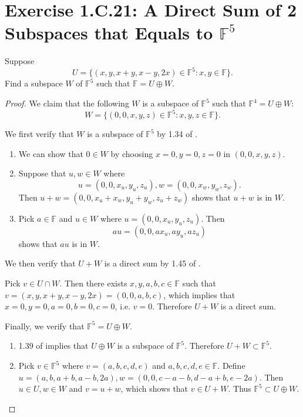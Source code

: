\section{Exercise 1.C.21: A Direct Sum of 2 Subspaces that Equals to $\mathbb{F}^5$}
Suppose\[
U=\{(x,y,x+y,x-y,2x)\in\mathbb{F}^5:x,y\in\mathbb{F}\}.
\]
Find a subspace $W$ of $\mathbb{F}^5$ such that $\mathbb{F}=U\oplus W$.
\begin{proof}
We claim that the following $W$ is a subspace of $\mathbb{F}^5$ such that $\mathbb{F}^4=U\oplus W$:
\[
W=\{(0,0,x,y,z)\in\mathbb{F}^5:x,y,z\in\mathbb{F}\}.
\]

We first verify that $W$ is a subspace of $\mathbb{F}^5$ by 1.34 of \cite{axler2014linear}.

\begin{enumerate}
\item We can show that $0\in W$ by choosing $x=0,y=0,z=0$ in $(0,0,x,y,z)$.
\item Suppose that $u,w\in W$ where \[u=(0,0,x_u,y_u,z_u), w=(0,0,x_w,y_w,z_w).\] Then $u+w=(0,0,x_u+x_w,y_u+y_w,z_u+z_w)$ shows that $u+w$ is in $W$.
\item Pick $a\in\mathbb{F}$ and $u\in W$ where $u=(0,0,x_u,y_u,z_u)$. Then \[au=(0,0,ax_u,ay_u,az_u)\] shows that $au$ is in $W$.
\end{enumerate}

We then verify that $U+W$ is a direct sum by 1.45 of \cite{axler2014linear}.

Pick $v\in U\cap W$. Then there exists $x,y,a,b,c\in\mathbb{F}$ such that $v=(x,y,x+y,x-y,2x)=(0,0,a,b,c)$, which implies that $x=0, y=0, a=0, b=0, c=0$, i.e. $v=0$. Therefore $U+W$ is a direct sum.

Finally, we verify that $\mathbb{F}^5=U\oplus W$.

\begin{enumerate}
\item 1.39 of \cite{axler2014linear} implies that $U\oplus W$ is a subspace of $\mathbb{F}^5$. Therefore $U+W\subset\mathbb{F}^5$.
\item Pick $v\in \mathbb{F}^5$ where $v=(a,b,c,d,e)$ and $a,b,c,d,e\in\mathbb{F}$. Define $u=(a,b,a+b,a-b,2a), w=(0,0,c-a-b,d-a+b,e-2a)$. Then $u\in U, w\in W$ and $v=u+w$, which shows that $v\in U+W$. Thus $\mathbb{F}^5\subset U\oplus W$.
\end{enumerate}
\end{proof}

